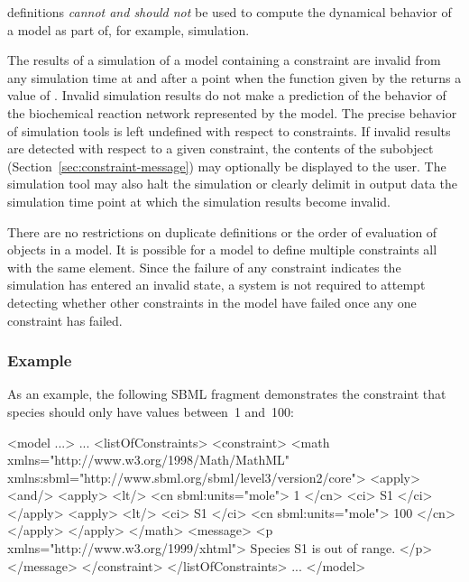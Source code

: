 \Constraint definitions \emph{cannot and should not} be used to
compute the dynamical behavior of a model as part of, for example,
simulation.  

The results of a simulation of a model containing a constraint are
invalid from any simulation time at and after a point when the
function given by the  returns a value of .
Invalid simulation results do not make a prediction of the
behavior of the biochemical reaction network represented by the
model.  The precise behavior of simulation tools is left undefined
with respect to constraints.  If invalid results are detected with
respect to a given constraint, the contents of the \Message
subobject (Section~\ref{sec:constraint-message}) may optionally be
displayed to the user.  The simulation tool may also halt the
simulation or clearly delimit in output data the simulation time
point at which the simulation results become invalid.

There are no restrictions on duplicate \Constraint
definitions or the order of evaluation of \Constraint objects in a
model.  It is possible for a model to define multiple constraints
all with the same  element.  Since the failure of any
constraint indicates the simulation has entered an invalid state,
a system is not required to attempt detecting whether
other constraints in the model have failed once any one constraint
has failed.


\subsubsection{Example}

As an example, the following SBML fragment demonstrates the
constraint that species  should only have values between~1
and~100:

\begin{example}
<model ...>
    ...
    <listOfConstraints>
        <constraint>
            <math xmlns="http://www.w3.org/1998/Math/MathML"
                  xmlns:sbml="http://www.sbml.org/sbml/level3/version2/core">
                <apply>
                    <and/>
                        <apply> 
                          <lt/> 
                          <cn sbml:units="mole"> 1 </cn> 
                          <ci> S1 </ci> 
                        </apply>
                        <apply> 
                          <lt/> 
                          <ci> S1 </ci>  
                          <cn sbml:units="mole"> 100 </cn> 
                        </apply>
                </apply>
            </math>
            <message>
                <p xmlns="http://www.w3.org/1999/xhtml"> Species S1 is out of range. </p>
            </message>
        </constraint>
    </listOfConstraints>
    ...
</model>
\end{example}


